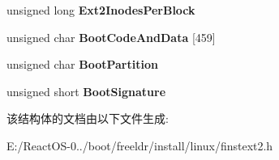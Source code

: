 \begin{DoxyCompactItemize}
\item 
\mbox{\label{struct_p_a_c_k_e_d_a179eb9be626dbb3e142bcac49adfdd79}} 
unsigned long {\bfseries Ext2\+Inodes\+Per\+Block}
\item 
\mbox{\label{struct_p_a_c_k_e_d_a18f882f2fc0dd5bc226de1ca12197d3d}} 
unsigned char {\bfseries Boot\+Code\+And\+Data} \mbox{[}459\mbox{]}
\item 
\mbox{\label{struct_p_a_c_k_e_d_aa2fda02dbf2bcb67e65567ec773d252f}} 
unsigned char {\bfseries Boot\+Partition}
\item 
\mbox{\label{struct_p_a_c_k_e_d_a0f79ea9a7370f7b420691c3acff7243f}} 
unsigned short {\bfseries Boot\+Signature}
\end{DoxyCompactItemize}


该结构体的文档由以下文件生成\+:\begin{DoxyCompactItemize}
\item 
E\+:/\+React\+O\+S-\/0../boot/freeldr/install/linux/finstext2.\+h\end{DoxyCompactItemize}

